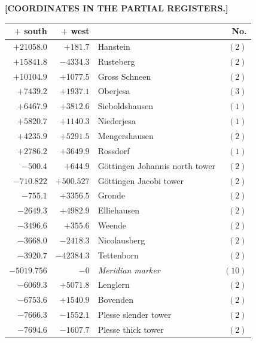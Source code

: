 \clearpage
{}
\begin{center}\textbf{[COORDINATES IN THE PARTIAL REGISTERS.]}\end{center}
\begin{center}\begingroup\fontsize{8}{9}\selectfont
\setlength{\tabcolsep}{4pt}
\begin{tabular}{r|r|p{170pt}|r}\hline
\(+\) south&\(+\) west&&No.\\\hline
\(+21058.0\)&\(+181.7\)&Hanstein&\((2)\)\\
\(+15841.8\)&\(-4334.3\)&Rusteberg&\((2)\)\\
\(+10104.9\)&\(+1077.5\)&Gross Schneen&\((2)\)\\
\(+7439.2\)&\(+1937.1\)&Oberjesa&\((3)\)\\
\(+6467.9\)&\(+3812.6\)&Sieboldshausen&\((1)\)\\
\(+5820.7\)&\(+1140.3\)&Niederjesa&\((1)\)\\
\(+4235.9\)&\(+5291.5\)&Mengershausen&\((2)\)\\
\(+2786.2\)&\(+3649.9\)&Rossdorf&\((1)\)\\
\(-500.4\)&\(+644.9\)&Göttingen Johannis north tower&\((2)\)\\
\(-710.822\)&\(+500.527\)&Göttingen Jacobi tower&\((2)\)\\
\(-755.1\)&\(+3356.5\)&Gronde&\((2)\)\\
\(-2649.3\)&\(+4982.9\)&Elliehausen&\((2)\)\\
\(-3496.6\)&\(+355.6\)&Weende&\((2)\)\\
\(-3668.0\)&\(-2418.3\)&Nicolausberg&\((2)\)\\
\(-3920.7\)&\(-42384.3\)&Tettenborn&\((2)\)\\
\(-5019.756\)&\(-0\)&\textit{Meridian marker}&\((10)\)\\
\(-6069.3\)&\(+5071.8\)&Lenglern&\((2)\)\\
\(-6753.6\)&\(+1540.9\)&Bovenden&\((2)\)\\
\(-7666.3\)&\(-1552.1\)&Plesse slender tower&\((2)\)\\
\(-7694.6\)&\(-1607.7\)&Plesse thick tower&\((2)\)\\
\hline\end{tabular}\endgroup\end{center}
\clearpage
